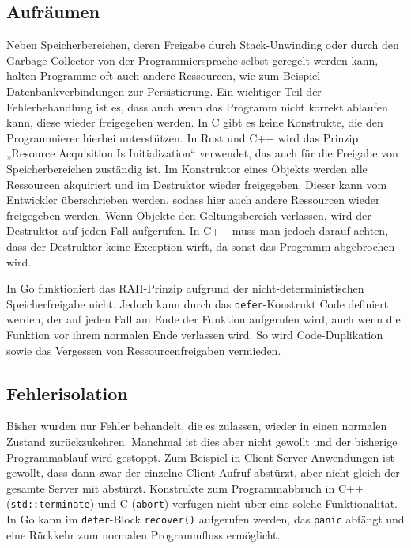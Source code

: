 \subsection{Aufräumen}
Neben Speicherbereichen, deren Freigabe durch Stack-Unwinding oder durch den Garbage Collector von der Programmiersprache selbst geregelt werden kann, halten Programme oft auch andere Ressourcen, wie zum Beispiel Datenbankverbindungen zur Persistierung. Ein wichtiger Teil der Fehlerbehandlung ist es, dass auch wenn das Programm nicht korrekt ablaufen kann, diese wieder freigegeben werden. In C gibt es keine Konstrukte, die den Programmierer hierbei unterstützen. In Rust und C++ wird das Prinzip „Resource Acquisition Is Initialization“ verwendet, das auch für die Freigabe von Speicherbereichen zuständig ist. Im Konstruktor eines Objekts werden alle Ressourcen akquiriert und im Destruktor wieder freigegeben. Dieser kann vom Entwickler überschrieben werden, sodass hier auch andere Ressourcen wieder freigegeben werden. Wenn Objekte den Geltungsbereich verlassen, wird der Destruktor auf jeden Fall aufgerufen. In C++ muss man jedoch darauf achten, dass der Destruktor keine Exception wirft, da sonst das Programm abgebrochen wird.

\begin{figure}[htp]
	\centering
	
	\label{fig:raii}
\end{figure}

In Go funktioniert das RAII-Prinzip aufgrund der nicht-deterministischen Speicherfreigabe nicht. Jedoch kann durch das \texttt{defer}-Konstrukt Code definiert werden, der auf jeden Fall am Ende der Funktion aufgerufen wird, auch wenn die Funktion vor ihrem normalen Ende verlassen wird. So wird Code-Duplikation sowie das Vergessen von Ressourcenfreigaben vermieden.

\begin{figure}[htp]
	\centering
	
	\label{fig:defer}
\end{figure}

\subsection{Fehlerisolation}
Bisher wurden nur Fehler behandelt, die es zulassen, wieder in einen normalen Zustand zurückzukehren. Manchmal ist dies aber nicht gewollt und der bisherige Programmablauf wird gestoppt. Zum Beispiel in Client-Server-Anwendungen ist gewollt, dass dann zwar der einzelne Client-Aufruf abstürzt, aber nicht gleich der gesamte Server mit abstürzt. Konstrukte zum Programmabbruch in C++ (\texttt{std::terminate}) und C (\texttt{abort}) verfügen nicht über eine solche Funktionalität. In Go kann im \texttt{defer}-Block \texttt{recover()} aufgerufen werden, das \texttt{panic} abfängt und eine Rückkehr zum normalen Programmfluss ermöglicht.

